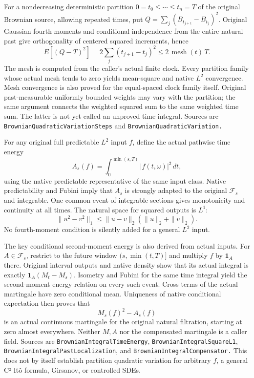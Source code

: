 \documentclass[
  english,
  11pt,
  oneside]{book}
\begin{document}
For a nondecreasing deterministic partition \(0=t_0\le\cdots\le t_n=T\) of the original Brownian source, allowing repeated times, put \(Q=\sum_j(B_{t_{j+1}}-B_{t_j})^2\). Original Gaussian fourth moments and conditional independence from the entire natural past give orthogonality of centered squared increments, hence \[E[(Q-T)^2]=2\sum_j(t_{j+1}-t_j)^2
\le2\,\operatorname{mesh}(t)\,T.\] The mesh is computed from the caller's actual finite clock. Every partition family whose actual mesh tends to zero yields mean-square and native \(L^2\) convergence. Mesh convergence is also proved for the equal-spaced clock family itself. Original past-measurable uniformly bounded weights may vary with the partition; the same argument connects the weighted squared sum to the same weighted time sum. The latter is not yet called an unproved time integral. Sources are \nolinkurl{BrownianQuadraticVariationSteps} and \nolinkurl{BrownianQuadraticVariation.}

For any original full predictable \(L^2\) input \(f\), define the actual pathwise time energy \[A_s(f)=\int_0^{\min(s,T)}|f(t,\omega)|^2\,dt,\] using the native predictable representative of the same input class. Native predictability and Fubini imply that \(A_s\) is strongly adapted to the original \(\mathcal F_s\) and integrable. One common event of integrable sections gives monotonicity and continuity at all times. The natural space for squared outputs is \(L^1\): \[\|u^2-v^2\|_1\le\|u-v\|_2(\|u\|_2+\|v\|_2).\] No fourth-moment condition is silently added for a general \(L^2\) input.

The key conditional second-moment energy is also derived from actual inputs. For \(A\in\mathcal F_s\), restrict to the future window \((s,\min(t,T)]\) and multiply \(f\) by \(\mathbf1_A\) there. Original interval outputs and native density show that its actual integral is exactly \(\mathbf1_A(M_t-M_s)\). Isometry and Fubini for the same time integral yield the second-moment energy relation on every such event. Cross terms of the actual martingale have zero conditional mean. Uniqueness of native conditional expectation then proves that \[M_s(f)^2-A_s(f)\] is an actual continuous martingale for the original natural filtration, starting at zero almost everywhere. Neither \(M,A\) nor the compensated martingale is a caller field. Sources are \nolinkurl{BrownianIntegralTimeEnergy}, \nolinkurl{BrownianIntegralSquareL1}, \nolinkurl{BrownianIntegralPastLocalization}, and \nolinkurl{BrownianIntegralCompensator.} This does not by itself establish partition quadratic variation for arbitrary \(f\), a general C² Itô formula, Girsanov, or controlled SDEs.
\end{document}
